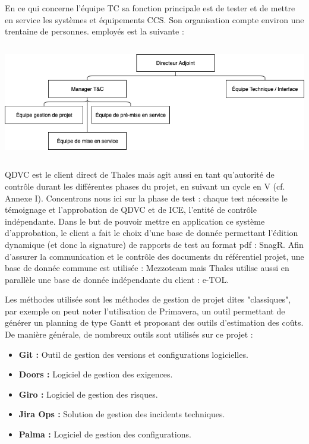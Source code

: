 En ce qui concerne l'équipe \gls{TC} sa fonction principale est de tester et de mettre en service les systèmes et équipements \gls{CCS}.
Son organisation compte environ une trentaine de personnes.
employés est la suivante :

\begin{center}
\includegraphics[height=5cm]{ressources/images/figures/OBS2.png}
\end{center}

QDVC est le client direct de Thales mais agit aussi en tant qu'autorité de contrôle durant les différentes phases du projet, en suivant un cycle en V (cf. Annexe I). Concentrons nous ici sur la phase de test : chaque test nécessite le témoignage et l'approbation de QDVC et de ICE, l'entité de contrôle indépendante.
Dans le but de pouvoir mettre en application ce système d'approbation, le client a fait le choix d'une base de donnée permettant l'édition dynamique (et donc la signature) de rapports de test au format pdf : \gls{SnagR}.
Afin d'assurer la communication et le contrôle des documents du référentiel projet, une base de donnée commune est utilisée : \gls{Mezzoteam} mais Thales utilise aussi en parallèle une  base de donnée indépendante du client : \gls{e-TOL}.

Les méthodes utilisée sont les méthodes de gestion de projet dites "classiques", par exemple on peut noter l'utilisation de Primavera, un outil permettant de générer un planning de type Gantt et proposant des outils d'estimation des coûts.
De manière générale, de nombreux outils sont utilisés sur ce projet :
\begin{itemize}
\item \textbf{\gls{Git} :} Outil de gestion des versions et configurations logicielles.
\item \textbf{Doors :} Logiciel de gestion des exigences.
\item \textbf{Giro :} Logiciel de gestion des risques.
\item \textbf{Jira Ops :} Solution de gestion des incidents techniques.
\item \textbf{Palma :} Logiciel de gestion des configurations. 
\end{itemize}

